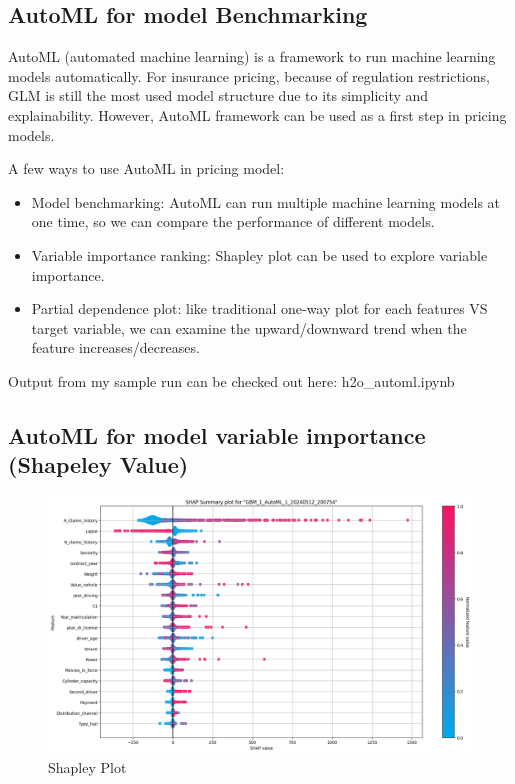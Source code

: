 \documentclass{article}
\begin{document}
\subsection{AutoML for model Benchmarking} 

AutoML (automated machine learning) is a framework to run machine learning models automatically. For insurance pricing, because of regulation restrictions, GLM is still the most used model structure due to its simplicity and explainability. However, AutoML framework can be used as a first step in pricing models. 

A few ways to use AutoML in pricing model:
\begin{itemize}
    \item Model benchmarking: AutoML can run multiple machine learning models at one time, so we can compare the performance of different models.
    \item Variable importance ranking: Shapley plot can be used to explore variable importance.
    \item Partial dependence plot: like traditional one-way plot for each features VS target variable, we can examine the upward/downward trend when the feature increases/decreases.
\end{itemize}

Output from my sample run can be checked out here: h2o_automl.ipynb
 
\subsection{AutoML for model variable importance (Shapeley Value)} 

\begin{figure}[h!]
\centering
\includegraphics[scale=0.4]{shap_plot.png}
\caption{Shapley Plot}
\label{fig:univerise}
\end{figure}
\end{document}
